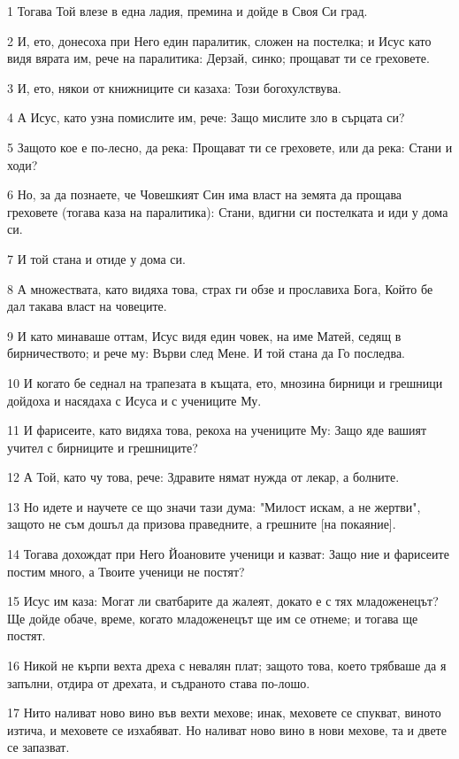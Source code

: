 \par 1 Тогава Той влезе в една ладия, премина и дойде в Своя Си град.
\par 2 И, ето, донесоха при Него един паралитик, сложен на постелка; и Исус като видя вярата им, рече на паралитика: Дерзай, синко; прощават ти се греховете.
\par 3 И, ето, някои от книжниците си казаха: Този богохулствува.
\par 4 А Исус, като узна помислите им, рече: Защо мислите зло в сърцата си?
\par 5 Защото кое е по-лесно, да река: Прощават ти се греховете, или да река: Стани и ходи?
\par 6 Но, за да познаете, че Човешкият Син има власт на земята да прощава греховете (тогава каза на паралитика): Стани, вдигни си постелката и иди у дома си.
\par 7 И той стана и отиде у дома си.
\par 8 А множествата, като видяха това, страх ги обзе и прославиха Бога, Който бе дал такава власт на човеците.
\par 9 И като минаваше оттам, Исус видя един човек, на име Матей, седящ в бирничеството; и рече му: Върви след Мене. И той стана да Го последва.
\par 10 И когато бе седнал на трапезата в къщата, ето, мнозина бирници и грешници дойдоха и насядаха с Исуса и с учениците Му.
\par 11 И фарисеите, като видяха това, рекоха на учениците Му: Защо яде вашият учител с бирниците и грешниците?
\par 12 А Той, като чу това, рече: Здравите нямат нужда от лекар, а болните.
\par 13 Но идете и научете се що значи тази дума: "Милост искам, а не жертви", защото не съм дошъл да призова праведните, а грешните [на покаяние].
\par 14 Тогава дохождат при Него Йоановите ученици и казват: Защо ние и фарисеите постим много, а Твоите ученици не постят?
\par 15 Исус им каза: Могат ли сватбарите да жалеят, докато е с тях младоженецът? Ще дойде обаче, време, когато младоженецът ще им се отнеме; и тогава ще постят.
\par 16 Никой не кърпи вехта дреха с невалян плат; защото това, което трябваше да я запълни, отдира от дрехата, и съдраното става по-лошо.
\par 17 Нито наливат ново вино във вехти мехове; инак, меховете се спукват, виното изтича, и меховете се изхабяват. Но наливат ново вино в нови мехове, та и двете се запазват.
